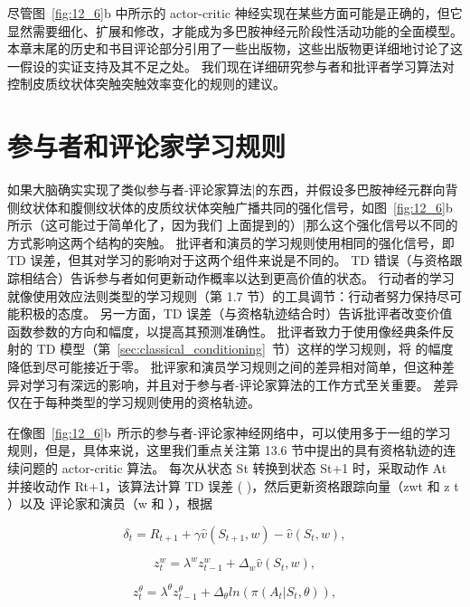 {尽管图~\ref{fig:12_6}b 中所示的 actor-critic 神经实现在某些方面可能是正确的，但它显然需要细化、扩展和修改，才能成为多巴胺神经元阶段性活动功能的全面模型。
本章末尾的历史和书目评论部分引用了一些出版物，这些出版物更详细地讨论了这一假设的实证支持及其不足之处。
我们现在详细研究参与者和批评者学习算法对控制皮质纹状体突触突触效率变化的规则的建议。





\section{参与者和评论家学习规则} \label{sec:ac_rules}

如果大脑确实实现了类似参与者-评论家算法|的东西，并假设多巴胺神经元群向背侧纹状体和腹侧纹状体的皮质纹状体突触广播共同的强化信号，如图~\ref{fig:12_6}b 所示（这可能过于简单化了，因为我们 上面提到的）|那么这个强化信号以不同的方式影响这两个结构的突触。
批评者和演员的学习规则使用相同的强化信号，即 TD 误差，但其对学习的影响对于这两个组件来说是不同的。
TD 错误（与资格跟踪相结合）告诉参与者如何更新动作概率以达到更高价值的状态。
行动者的学习就像使用效应法则类型的学习规则（第 1.7 节）的工具调节：行动者努力保持尽可能积极的态度。
另一方面，TD 误差（与资格轨迹结合时）告诉批评者改变价值函数参数的方向和幅度，以提高其预测准确性。
批评者致力于使用像经典条件反射的 TD 模型（第~\ref{sec:classical_conditioning}~节）这样的学习规则，将 的幅度降低到尽可能接近于零。
批评家和演员学习规则之间的差异相对简单，但这种差异对学习有深远的影响，并且对于参与者-评论家算法的工作方式至关重要。
差异仅在于每种类型的学习规则使用的资格轨迹。


在像图~\ref{fig:12_6}b~所示的参与者-评论家神经网络中，可以使用多于一组的学习规则，但是，具体来说，这里我们重点关注第 13.6 节中提出的具有资格轨迹的连续问题的 actor-critic 算法。
每次从状态 St 转换到状态 St+1 时，采取动作 At 并接收动作 Rt+1，该算法计算 TD 误差 ( )，然后更新资格跟踪向量（zwt 和 z t ）以及 评论家和演员（w 和 ），根据

\begin{equation}
	\delta_t = R_{t+1}
		+ \gamma \hat{v} (S_{t+1}, w)
		- \hat{v} (S_t, w),
\end{equation}


\begin{equation}
	z_t ^w = \lambda^w z_{t-1}^w
		+ \Delta_w \hat{v} (S_t, w),
\end{equation}

\begin{equation}
	z_t^{\theta} = \lambda^{\theta} z_{t-1}^{\theta}
		+ \Delta_{\theta} ln(\pi(A_t | S_t, \theta)),
\end{equation}


}
